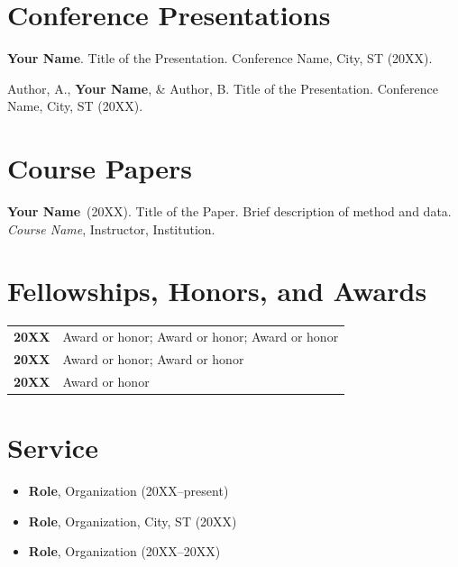 \documentclass[10pt]{extarticle}
\begin{document}
\section*{Conference Presentations}
\begin{publist}
  \item \textbf{Your Name}. Title of the Presentation. Conference Name, City, ST (20XX).
  \item Author, A., \textbf{Your Name}, \& Author, B. Title of the Presentation. Conference Name, City, ST (20XX).
\end{publist}

\section*{Course Papers}
\begin{publist}
  \item \textbf{Your Name}\ (20XX). Title of the Paper. Brief description of method and data. \textit{Course Name}, Instructor, Institution.
\end{publist}

\section*{Fellowships, Honors, and Awards}
\begin{tabular}{@{}p{0.55in}p{5.65in}@{}}
  \textbf{20XX} & Award or honor; Award or honor; Award or honor \\[0.4em]
  \textbf{20XX} & Award or honor; Award or honor \\[0.4em]
  \textbf{20XX} & Award or honor
\end{tabular}

\section*{Service}
\begin{itemize}
  \item \textbf{Role}, Organization (20XX--present)
  \item \textbf{Role}, Organization, City, ST (20XX)
  \item \textbf{Role}, Organization (20XX--20XX)
\end{itemize}
\end{document}
